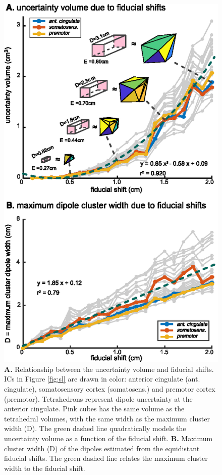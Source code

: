 \documentclass{UCF_ETD}
\begin{document}
\begin{figure}[h!]
      \centering
      \includegraphics[scale=1.0]{img/fig2.eps}
      \caption{\textbf{A.} Relationship between the uncertainty volume and fiducial shifts. ICs in Figure \ref{fig:sl} are drawn in color: anterior cingulate (ant. cingulate), somatosensory cortex (somatosens.) and premotor cortex (premotor). Tetrahedrons represent dipole uncertainty at the anterior cingulate. Pink cubes has the same volume as the tetrahedral volumes, with the same width as the maximum cluster width (D). The green dashed line quadratically models the uncertainty volume as a function of the fiducial shift.
      \textbf{B.} Maximum cluster width (D) of the dipoles estimated from the equidistant fiducial shifts. The green dashed line relates the maximum cluster width to the fiducial shift.}
      \label{fig:unc}
\end{figure}
\end{document}
